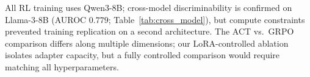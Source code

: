 All RL training uses Qwen3-8B; cross-model discriminability is confirmed on Llama-3-8B (AUROC $0.779$; Table~\ref{tab:cross_model}), but compute constraints prevented training replication on a second architecture.
The ACT vs.\ GRPO comparison differs along multiple dimensions; our LoRA-controlled ablation isolates adapter capacity, but a fully controlled comparison would require matching all hyperparameters.
